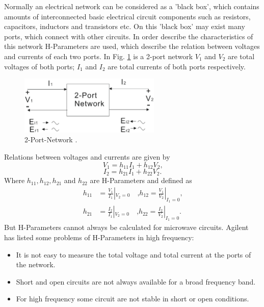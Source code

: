 Normally an electrical network can be considered as a 'black box', which contains amounts of interconnected basic electrical circuit components such as resistors, capacitors, inductors and transistors etc. On this 'black box' may exist many ports, which connect with other circuits. In order describe the characteristics of this network H-Parameters are used, which describe the relation between voltages and currents of each two ports. In Fig. \ref{fig:2_port_network} is a 2-port network $V_{1}$ and $V_{2}$ are total voltages of both ports; $I_{1}$ and $I_{2}$ are total currents of both ports respectively.\\
 
\begin{figure}[!ht]
\centering
\includegraphics[width=0.6\textwidth]{bilder/s_parameters}
\caption{2-Port-Network \cite{aglient_s_parameters}.}
\label{fig:2_port_network}
\end{figure}
Relations between voltages and currents are given by %
\begin{equation}
V_{1}=h_{11}I_{1}+h_{12}V_{2} \text{,}
\label{eq:voltage_current1}
\end{equation}
\begin{equation}
I_{2}=h_{21}I_{1}+h_{22}V_{2} \text{.}
\label{eq:voltage_current2}
\end{equation}
Where $h_{11},h_{12},h_{21}$ and $h_{22}$ are H-Parameters and defined as %
\begin{align}
h_{11}&=\frac{V_{1}}{I_{1}}|_{V_{2}=0}\quad\text{,} h_{12}=\frac{V_{1}}{V_{2}}|_{I_{1}=0}\text{,}
\label{eq:h_parameters1}\\
h_{21}&=\frac{I_{2}}{I_{1}}|_{V_{2}=0}\quad\text{,} h_{22}=\frac{I_{2}}{V_{2}}|_{I_{1}=0}\text{.}
\label{eq:h_parameters2}
\end{align}
But H-Parameters cannot always be calculated for microwave circuits. Agilent\cite{aglient_s_parameters} has listed some problems of H-Parameters in high frequency:
\begin{itemize}
\item It is not easy to measure the total voltage and total current at the ports of the network.
\item Short and open circuits are not always available for a broad frequency band.
\item For high frequency some circuit are not stable in short or open conditions.
\end{itemize}
